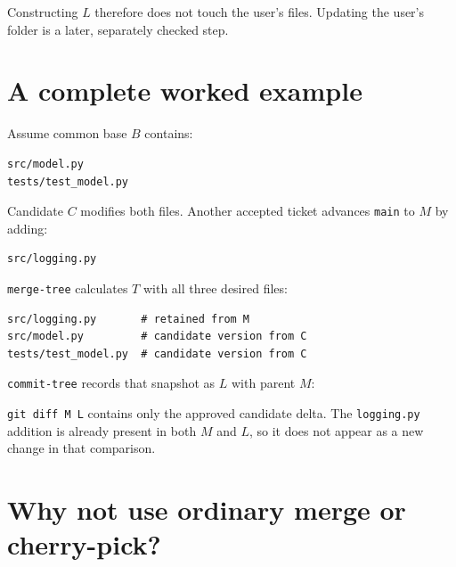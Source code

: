 \documentclass[10pt,twocolumn]{article}
\newcommand{\code}[1]{\texttt{#1}}
\begin{document}
Constructing $L$ therefore does not touch the user's files. Updating the
user's folder is a later, separately checked step.

\section{A complete worked example}

Assume common base $B$ contains:

\begin{lstlisting}
src/model.py
tests/test_model.py
\end{lstlisting}

Candidate $C$ modifies both files. Another accepted ticket advances
\code{main} to $M$ by adding:

\begin{lstlisting}
src/logging.py
\end{lstlisting}

\code{merge-tree} calculates $T$ with all three desired files:

\begin{lstlisting}
src/logging.py       # retained from M
src/model.py         # candidate version from C
tests/test_model.py  # candidate version from C
\end{lstlisting}

\code{commit-tree} records that snapshot as $L$ with parent $M$:

\begin{center}
\end{center}

\code{git diff M L} contains only the approved candidate delta. The
\code{logging.py} addition is already present in both $M$ and $L$, so it does
not appear as a new change in that comparison.

\section{Why not use ordinary merge or cherry-pick?}
\end{document}
